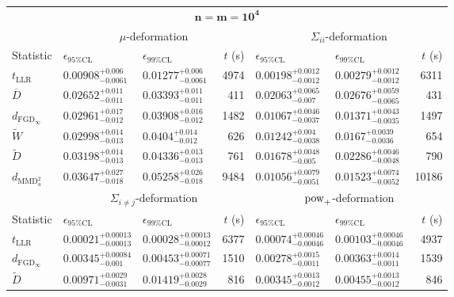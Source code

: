 \begin{tabular}{l|llr|llr}
	\toprule
	\multicolumn{7}{c}{$\mathbf{n=m=10^{4}}$} \\
	\multicolumn{1}{c}{} & \multicolumn{3}{c}{$\mu$-deformation} & \multicolumn{3}{c}{$\Sigma_{ii}$-deformation} \\
	Statistic & $\epsilon_{95\%\mathrm{CL}}$ & $\epsilon_{99\%\mathrm{CL}}$ & $t$ (s) & $\epsilon_{95\%\mathrm{CL}}$ & $\epsilon_{99\%\mathrm{CL}}$ & $t$ (s) \\
	\midrule
	$t_{\mathrm{LLR}}$ & $0.00908_{-0.0061}^{+0.006}$ & $0.01277_{-0.0061}^{+0.006}$ & 4974 & $0.00198_{-0.0012}^{+0.0012}$ & $0.00279_{-0.0012}^{+0.0012}$ & 6311 \\
	$\overline{D}$ & $0.02652_{-0.011}^{+0.011}$ & $0.03393_{-0.011}^{+0.011}$ & 411 & $0.02063_{-0.007}^{+0.0065}$ & $0.02676_{-0.0065}^{+0.0059}$ & 431 \\
	$d_{\mathrm{FGD}_{\infty}}$ & $0.02961_{-0.012}^{+0.017}$ & $0.03908_{-0.012}^{+0.016}$ & 1482 & $0.01067_{-0.0037}^{+0.0046}$ & $0.01371_{-0.0035}^{+0.0043}$ & 1497 \\
	$\widetilde{W}$ & $0.02998_{-0.013}^{+0.014}$ & $0.0404_{-0.012}^{+0.014}$ & 626 & $0.01242_{-0.0038}^{+0.004}$ & $0.0167_{-0.0036}^{+0.0039}$ & 654 \\
	$\widetilde{D}$ & $0.03198_{-0.013}^{+0.014}$ & $0.04336_{-0.013}^{+0.013}$ & 761 & $0.01678_{-0.005}^{+0.0048}$ & $0.02286_{-0.0048}^{+0.0046}$ & 790 \\
	$d_{\mathrm{MMD}^{2}_{u}}$ & $0.03647_{-0.018}^{+0.027}$ & $0.05258_{-0.018}^{+0.026}$ & 9484 & $0.01056_{-0.0051}^{+0.0079}$ & $0.01523_{-0.0052}^{+0.0074}$ & 10186 \\
	\toprule
	\multicolumn{1}{c}{} & \multicolumn{3}{c}{$\Sigma_{i\neq j}$-deformation} & \multicolumn{3}{c}{$\rm{pow}_{+}$-deformation} \\
	Statistic & $\epsilon_{95\%\mathrm{CL}}$ & $\epsilon_{99\%\mathrm{CL}}$ & $t$ (s) & $\epsilon_{95\%\mathrm{CL}}$ & $\epsilon_{99\%\mathrm{CL}}$ & $t$ (s) \\
	\midrule
	$t_{\mathrm{LLR}}$ & $0.00021_{-0.00013}^{+0.00013}$ & $0.00028_{-0.00012}^{+0.00013}$ & 6377 & $0.00074_{-0.00046}^{+0.00046}$ & $0.00103_{-0.00046}^{+0.00046}$ & 4937 \\
	$d_{\mathrm{FGD}_{\infty}}$ & $0.00345_{-0.001}^{+0.00084}$ & $0.00453_{-0.00077}^{+0.00071}$ & 1510 & $0.00278_{-0.0011}^{+0.0015}$ & $0.00363_{-0.0011}^{+0.0014}$ & 1539 \\
	$\widetilde{D}$ & $0.00971_{-0.0031}^{+0.0029}$ & $0.01419_{-0.0029}^{+0.0028}$ & 816 & $0.00345_{-0.0012}^{+0.0013}$ & $0.00455_{-0.0012}^{+0.0013}$ & 846 \\

\end{tabular}
